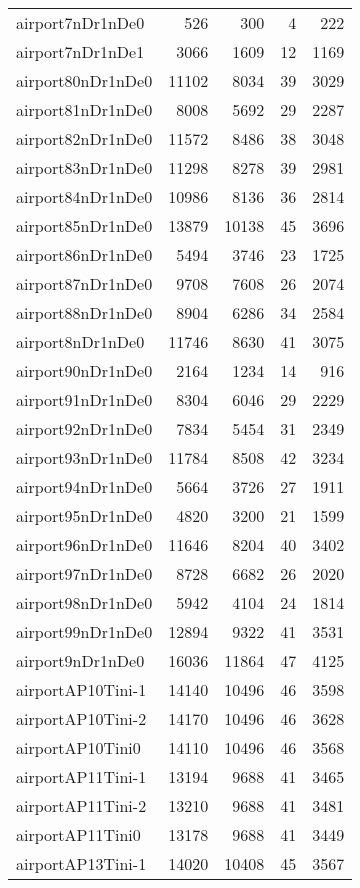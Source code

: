 \begin{longtable}{lrrrr}
airport7nDr1nDe0 & 526 & 300 & 4 & 222 \\
airport7nDr1nDe1 & 3066 & 1609 & 12 & 1169 \\
airport80nDr1nDe0 & 11102 & 8034 & 39 & 3029 \\
airport81nDr1nDe0 & 8008 & 5692 & 29 & 2287 \\
airport82nDr1nDe0 & 11572 & 8486 & 38 & 3048 \\
airport83nDr1nDe0 & 11298 & 8278 & 39 & 2981 \\
airport84nDr1nDe0 & 10986 & 8136 & 36 & 2814 \\
airport85nDr1nDe0 & 13879 & 10138 & 45 & 3696 \\
airport86nDr1nDe0 & 5494 & 3746 & 23 & 1725 \\
airport87nDr1nDe0 & 9708 & 7608 & 26 & 2074 \\
airport88nDr1nDe0 & 8904 & 6286 & 34 & 2584 \\
airport8nDr1nDe0 & 11746 & 8630 & 41 & 3075 \\
airport90nDr1nDe0 & 2164 & 1234 & 14 & 916 \\
airport91nDr1nDe0 & 8304 & 6046 & 29 & 2229 \\
airport92nDr1nDe0 & 7834 & 5454 & 31 & 2349 \\
airport93nDr1nDe0 & 11784 & 8508 & 42 & 3234 \\
airport94nDr1nDe0 & 5664 & 3726 & 27 & 1911 \\
airport95nDr1nDe0 & 4820 & 3200 & 21 & 1599 \\
airport96nDr1nDe0 & 11646 & 8204 & 40 & 3402 \\
airport97nDr1nDe0 & 8728 & 6682 & 26 & 2020 \\
airport98nDr1nDe0 & 5942 & 4104 & 24 & 1814 \\
airport99nDr1nDe0 & 12894 & 9322 & 41 & 3531 \\
airport9nDr1nDe0 & 16036 & 11864 & 47 & 4125 \\
airportAP10Tini-1 & 14140 & 10496 & 46 & 3598 \\
airportAP10Tini-2 & 14170 & 10496 & 46 & 3628 \\
airportAP10Tini0 & 14110 & 10496 & 46 & 3568 \\
airportAP11Tini-1 & 13194 & 9688 & 41 & 3465 \\
airportAP11Tini-2 & 13210 & 9688 & 41 & 3481 \\
airportAP11Tini0 & 13178 & 9688 & 41 & 3449 \\
airportAP13Tini-1 & 14020 & 10408 & 45 & 3567 \\

\end{longtable}
